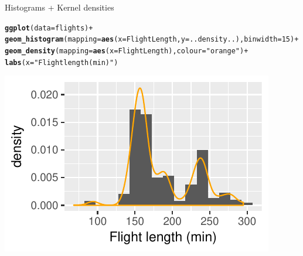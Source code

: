 \documentclass[10pt]{beamer}\usepackage[]{graphicx}\usepackage[]{color}
\makeatletter
\def\maxwidth{ %
  \ifdim\Gin@nat@width>\linewidth
    \linewidth
  \else
    \Gin@nat@width
  \fi
}
\newcommand{\hlnum}[1]{\textcolor[rgb]{0.686,0.059,0.569}{#1}}%
\newcommand{\hlstr}[1]{\textcolor[rgb]{0.192,0.494,0.8}{#1}}%
\newcommand{\hlopt}[1]{\textcolor[rgb]{0,0,0}{#1}}%
\newcommand{\hlstd}[1]{\textcolor[rgb]{0.345,0.345,0.345}{#1}}%
\newcommand{\hlkwc}[1]{\textcolor[rgb]{0.333,0.667,0.333}{#1}}%
\newcommand{\hlkwd}[1]{\textcolor[rgb]{0.737,0.353,0.396}{\textbf{#1}}}%
\newenvironment{kframe}{%
 \def\at@end@of@kframe{}%
 \ifinner\ifhmode%
  \def\at@end@of@kframe{\end{minipage}}%
  \begin{minipage}{\columnwidth}%
 \fi\fi%
 \def\FrameCommand##1{\hskip\@totalleftmargin \hskip-\fboxsep
 \colorbox{shadecolor}{##1}\hskip-\fboxsep
     \hskip-\linewidth \hskip-\@totalleftmargin \hskip\columnwidth}%
 \MakeFramed {\advance\hsize-\width
   \@totalleftmargin\z@ \linewidth\hsize
   \@setminipage}}%
 {\par\unskip\endMakeFramed%
 \at@end@of@kframe}
\newenvironment{knitrout}{}{} %
\makeatother
\begin{document}
\begin{frame}[fragile]{Histograms + Kernel densities}

\begin{knitrout}\scriptsize
{}\color{fgcolor}\begin{kframe}
\begin{alltt}
\hlkwd{ggplot}\hlstd{(}\hlkwc{data} \hlstd{= flights)} \hlopt{+}
  \hlkwd{geom_histogram}\hlstd{(}\hlkwc{mapping} \hlstd{=} \hlkwd{aes}\hlstd{(}\hlkwc{x} \hlstd{= FlightLength,} \hlkwc{y} \hlstd{= ..density..),} \hlkwc{binwidth} \hlstd{=} \hlnum{15}\hlstd{)} \hlopt{+}
  \hlkwd{geom_density}\hlstd{(}\hlkwc{mapping} \hlstd{=} \hlkwd{aes}\hlstd{(}\hlkwc{x} \hlstd{= FlightLength),} \hlkwc{colour} \hlstd{=} \hlstr{"orange"}\hlstd{)} \hlopt{+}
  \hlkwd{labs}\hlstd{(}\hlkwc{x} \hlstd{=} \hlstr{"Flight length (min)"}\hlstd{)}
\end{alltt}
\end{kframe}
\includegraphics[width=\maxwidth]{figure/unnamed-chunk-19-1} 

\end{knitrout}

\end{frame}
\end{document}
